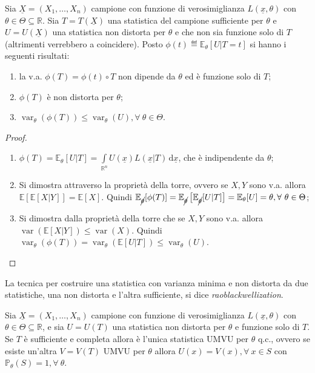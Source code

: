 \documentclass[hidelinks, 10pt]{report}
\DeclareMathOperator{\var}{var}
\begin{document}
\begin{thm}
Sia $ \underline{X} = (X_1, \dotsc, X_n) $ campione con funzione di verosimiglianza $ L(\underline{x}, \theta) $ con $ \theta \in \Theta \subseteq \mathbb{R} $. Sia $ T = T(\underline{X}) $ una statistica del campione sufficiente per $ \theta $ e $ U = U(\underline{X}) $ una statistica non distorta per $ \theta $ e che non sia funzione solo di $ T $ (altrimenti verrebbero a coincidere). Posto $ \phi(t) \eqdef \mathbb{E}_{\theta} [U \vert T = t] $ si hanno i seguenti risultati:
\begin{enumerate}
\item la v.a. $ \phi(T) = \phi(t) \circ T $ non dipende da $ \theta $ ed \`e funzione solo di $ T $;
\item $ \phi(T) $ \`e non distorta per $ \theta $;
\item $ \var_{\theta} (\phi(T)) \le \var_{\theta} (U), \forall\ \theta \in \Theta $.
\end{enumerate}
\end{thm}

\begin{proof}
\noindent
\begin{enumerate}
\item $ \phi(T) = \mathbb{E}_{\theta} [U \vert T] = \int\limits_{\mathbb{R}^n} U(\underline{x}) L(\underline{x} \vert T) \, \mathrm{d}\underline{x} $, che \`e indipendente da $ \theta $;
\item Si dimostra attraverso la propriet\`a della torre, ovvero se $ X, Y $ sono v.a. allora $ \mathbb{E} \left[  \mathbb{E} [X \vert Y] \right] = \mathbb{E} [X] $. Quindi $ \mathbb{E}_{\cancel{\theta}} [\phi(T)] = \mathbb{E}_{\cancel{\theta}} \left[ \mathbb{E}_{\cancel{\theta}} [U \vert T] \right] = \mathbb{E}_{\theta} [U] = \theta, \forall\ \theta \in \Theta $;
\item Si dimostra dalla propriet\`a della torre che se $ X, Y $ sono v.a. allora $ \var (\mathbb{E} [X \vert Y]) \le \var(X) $. Quindi $ \var_{\theta} (\phi(T)) = \var_{\theta} (\mathbb{E}[U \vert T]) \le \var_{\theta} (U) $.
\end{enumerate}
\end{proof}

La tecnica per costruire una statistica con varianza minima e non distorta da due statistiche, una non distorta e l'altra sufficiente, si dice \emph{raoblackwellization}.

\begin{thm}
Sia $ \underline{X} = (X_1, \dotsc, X_n) $ campione con funzione di verosimiglianza $ L(\underline{x}, \theta) $ con $ \theta \in \Theta \subseteq \mathbb{R} $, e sia $ U = U(T) $ una statistica non distorta per $ \theta $ e funzione solo di $ T $. Se $ T $ \`e sufficiente e completa allora \`e l'unica statistica UMVU per $ \theta $ q.c., ovvero se esiste un'altra $ V = V(T) $ UMVU per $ \theta $ allora $ U(x) = V(x), \forall\ x \in S $ con $ \mathbb{P}_{\theta} (S) = 1, \forall\ \theta $.
\end{thm}
\end{document}
